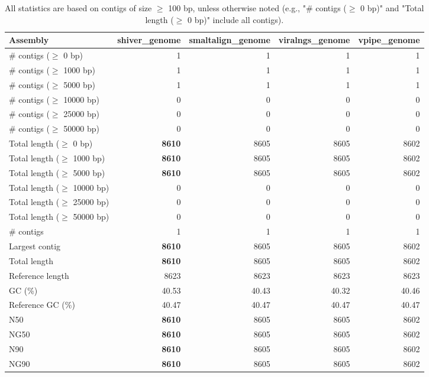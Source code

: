 \documentclass[12pt,a4paper]{article}
\begin{document}
\begin{table}[ht]
\begin{center}
\caption{All statistics are based on contigs of size $\geq$ 100 bp, unless otherwise noted (e.g., "\# contigs ($\geq$ 0 bp)" and "Total length ($\geq$ 0 bp)" include all contigs).}
\begin{tabular}{|l*{4}{|r}|}
\hline
Assembly & shiver\_genome & smaltalign\_genome & viralngs\_genome & vpipe\_genome \\ \hline
\# contigs ($\geq$ 0 bp) & 1 & 1 & 1 & 1 \\ \hline
\# contigs ($\geq$ 1000 bp) & 1 & 1 & 1 & 1 \\ \hline
\# contigs ($\geq$ 5000 bp) & 1 & 1 & 1 & 1 \\ \hline
\# contigs ($\geq$ 10000 bp) & 0 & 0 & 0 & 0 \\ \hline
\# contigs ($\geq$ 25000 bp) & 0 & 0 & 0 & 0 \\ \hline
\# contigs ($\geq$ 50000 bp) & 0 & 0 & 0 & 0 \\ \hline
Total length ($\geq$ 0 bp) & {\bf 8610} & 8605 & 8605 & 8602 \\ \hline
Total length ($\geq$ 1000 bp) & {\bf 8610} & 8605 & 8605 & 8602 \\ \hline
Total length ($\geq$ 5000 bp) & {\bf 8610} & 8605 & 8605 & 8602 \\ \hline
Total length ($\geq$ 10000 bp) & 0 & 0 & 0 & 0 \\ \hline
Total length ($\geq$ 25000 bp) & 0 & 0 & 0 & 0 \\ \hline
Total length ($\geq$ 50000 bp) & 0 & 0 & 0 & 0 \\ \hline
\# contigs & 1 & 1 & 1 & 1 \\ \hline
Largest contig & {\bf 8610} & 8605 & 8605 & 8602 \\ \hline
Total length & {\bf 8610} & 8605 & 8605 & 8602 \\ \hline
Reference length & 8623 & 8623 & 8623 & 8623 \\ \hline
GC (\%) & 40.53 & 40.43 & 40.32 & 40.46 \\ \hline
Reference GC (\%) & 40.47 & 40.47 & 40.47 & 40.47 \\ \hline
N50 & {\bf 8610} & 8605 & 8605 & 8602 \\ \hline
NG50 & {\bf 8610} & 8605 & 8605 & 8602 \\ \hline
N90 & {\bf 8610} & 8605 & 8605 & 8602 \\ \hline
NG90 & {\bf 8610} & 8605 & 8605 & 8602 \\ \hline

\end{tabular}
\end{center}
\end{table}
\end{document}
